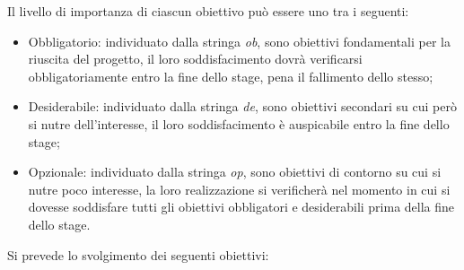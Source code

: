 Il livello di importanza di ciascun obiettivo può essere uno tra i seguenti:
\begin{itemize}
	\item Obbligatorio: individuato dalla stringa \textit{ob}, sono obiettivi fondamentali per la riuscita del progetto, il loro soddisfacimento dovrà verificarsi obbligatoriamente entro la fine dello stage, pena il fallimento dello stesso;
	\item Desiderabile: individuato dalla stringa \textit{de}, sono obiettivi secondari su cui però si nutre dell'interesse, il loro soddisfacimento è auspicabile entro la fine dello stage;
	\item Opzionale: individuato dalla stringa \textit{op}, sono obiettivi di contorno su cui si nutre poco interesse, la loro realizzazione si verificherà nel momento in cui si dovesse soddisfare tutti gli obiettivi obbligatori e desiderabili prima della fine dello stage.
\end{itemize}
\newpage
Si prevede lo svolgimento dei seguenti obiettivi:
